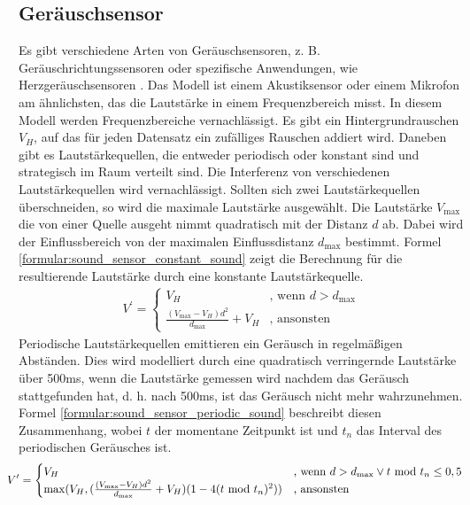 \subsection{Geräuschsensor}
Es gibt verschiedene Arten von Geräuschsensoren, z. B. Geräuschrichtungssensoren \cite{tiete2014soundcompass} oder
spezifische Anwendungen, wie Herzgeräuschsensoren \cite{zhang2016design}.
Das Modell ist einem Akustiksensor \cite{sessler1991acoustic} oder einem Mikrofon am ähnlichsten,
das die Lautstärke in einem Frequenzbereich misst.
\newline
\newline
In diesem Modell werden Frequenzbereiche vernachlässigt.
Es gibt ein Hintergrundrauschen $V_H$, auf das für jeden Datensatz ein zufälliges Rauschen addiert wird.
Daneben gibt es Lautstärkequellen, die entweder periodisch oder konstant sind und strategisch im Raum verteilt sind.
Die Interferenz von verschiedenen Lautstärkequellen wird vernachlässigt.
Sollten sich zwei Lautstärkequellen überschneiden, so wird die maximale Lautstärke ausgewählt.
\newline
\newline
Die Lautstärke $V_{\max}$ die von einer Quelle ausgeht nimmt quadratisch mit der Distanz $d$ ab.
Dabei wird der Einflussbereich von der maximalen Einflussdistanz $d_{\max}$ bestimmt.
Formel \ref{formular:sound_sensor_constant_sound} zeigt die Berechnung für die resultierende Lautstärke durch eine konstante Lautstärkequelle.
\begin{align}
    \label{formular:sound_sensor_constant_sound}
    V^{\prime} = \begin{cases}
                     V_H & \text{, wenn } d > d_{\max} \\
                     \frac{(V_{\max} - V_H)d^2}{d_{\max}} + V_H & \text{, ansonsten}
    \end{cases}
\end{align}
\newpage
Periodische Lautstärkequellen emittieren ein Geräusch in regelmäßigen Abständen.
Dies wird modelliert durch eine quadratisch verringernde Lautstärke über 500ms,
wenn die Lautstärke gemessen wird nachdem das Geräusch stattgefunden hat,
d. h. nach 500ms, ist das Geräusch nicht mehr wahrzunehmen.
Formel \ref{formular:sound_sensor_periodic_sound} beschreibt diesen Zusammenhang,
wobei $t$ der momentane Zeitpunkt ist und $t_{n}$ das Interval des periodischen Geräusches ist.
\begin{align}
    \label{formular:sound_sensor_periodic_sound}
    \hspace{-0.4cm}
    V^{\prime} = \begin{cases}
                     V_H & \text{, wenn } d > d_{\max} \vee t\ \text{mod}\ t_{n}\leq 0,5 \\
                     \max(V_H, (\frac{(V_{\max} - V_H)d^2}{d_{\max}} + V_H)(1 - 4(t\ \text{mod}\ t_{n})^2)) & \text{, ansonsten}
    \end{cases}
\end{align}

